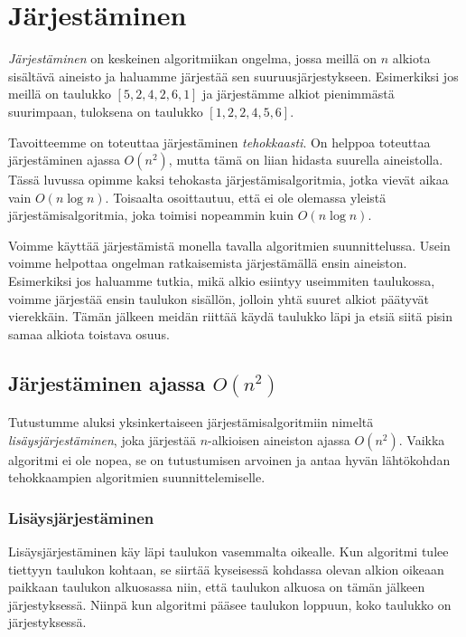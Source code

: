 \chapter{Järjestäminen}

\emph{Järjestäminen} on keskeinen algoritmiikan ongelma,
jossa meillä on $n$ alkiota sisältävä aineisto
ja haluamme järjestää sen suuruusjärjestykseen.
Esimerkiksi jos meillä on taulukko $[5,2,4,2,6,1]$ ja
järjestämme alkiot pienimmästä suurimpaan,
tuloksena on taulukko $[1,2,2,4,5,6]$.

Tavoitteemme on toteuttaa järjestäminen
\emph{tehokkaasti}.
On helppoa toteuttaa järjestäminen ajassa $O(n^2)$,
mutta tämä on liian hidasta suurella aineistolla.
Tässä luvussa opimme kaksi tehokasta
järjestämisalgoritmia, jotka vievät aikaa vain $O(n \log n)$.
Toisaalta osoittautuu, että ei ole olemassa
yleistä järjestämisalgoritmia, joka toimisi nopeammin
kuin $O(n \log n)$.

Voimme käyttää järjestämistä monella tavalla
algoritmien suunnittelussa.
Usein voimme helpottaa ongelman ratkaisemista
järjestämällä ensin aineiston.
Esimerkiksi jos haluamme tutkia,
mikä alkio esiintyy useimmiten taulukossa,
voimme järjestää ensin taulukon sisällön,
jolloin yhtä suuret alkiot päätyvät vierekkäin.
Tämän jälkeen meidän riittää käydä taulukko läpi
ja etsiä siitä pisin samaa alkiota toistava osuus.

\section{Järjestäminen ajassa $O(n^2)$}

Tutustumme aluksi yksinkertaiseen järjestämisalgoritmiin
nimeltä \emph{lisäysjär\-jestäminen},
joka järjestää $n$-alkioisen aineiston ajassa $O(n^2)$.
Vaikka algoritmi ei ole nopea, se on tutustumisen arvoinen
ja antaa hyvän lähtökohdan tehokkaampien algoritmien
suunnittelemiselle.

\subsection{Lisäysjärjestäminen}

Lisäysjärjestäminen käy läpi taulukon
vasemmalta oikealle.
Kun algoritmi tulee tiettyyn taulukon kohtaan,
se siirtää kyseisessä kohdassa olevan alkion
oikeaan paikkaan taulukon
alkuosassa niin, että taulukon alkuosa
on tämän jälkeen järjestyksessä.
Niinpä kun algoritmi pääsee taulukon loppuun,
koko taulukko on järjestyksessä.

